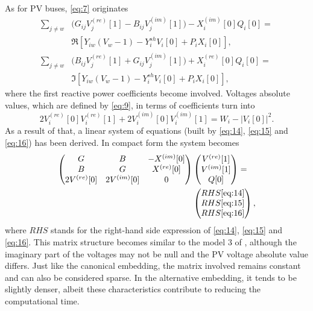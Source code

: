 \documentclass[conference]{IEEEtran}
\begin{document}
As for PV buses, \eqref{eq:7} originates
\begin{equation}
  \begin{split}
    \sum_{j\neq w}&\biggl(G_{ij}V^{(re)}_j[1]-B_{ij}V^{(im)}_j[1]\biggr)-X^{(im)}_i[0]Q_i[0]=\\
    &\Re[Y_{iw}(V_w-1) - Y^{sh}_iV_i[0]+P_iX_i[0]],\\
    \sum_{j\neq w}&\biggl(B_{ij}V^{(re)}_j[1]+G_{ij}V^{(im)}_j[1]\biggr)+X^{(re)}_i[0]Q_i[0]=\\
    &\Im[Y_{iw}(V_w-1) - Y^{sh}_iV_i[0]+P_iX_i[0]],
  \end{split}
  \label{eq:15}
\end{equation}
where the first reactive power coefficients become involved. Voltages absolute values, which are defined by \eqref{eq:9}, in terms of coefficients turn into
\begin{equation}
  2V^{(re)}_i[0]V^{(re)}_i[1]+2V^{(im)}_i[0]V^{(im)}_i[1]=W_i-|V_i[0]|^2.
  \label{eq:16}
\end{equation}
As a result of that, a linear system of equations (built by \eqref{eq:14}, \eqref{eq:15} and \eqref{eq:16}) has been derived. In compact form the system becomes
\begin{equation}
  \begin{split}
\begin{pmatrix}
    G & B & -X^{(im)}[0]\\
    B & G & X^{(re)}[0]\\
    2V^{(re)}[0] & 2V^{(im)}[0] & 0\\
  \end{pmatrix}&
  \begin{pmatrix}
    V^{(re)}[1]\\
    V^{(im)}[1]\\
    Q[0]
  \end{pmatrix}
  =\\
  &\begin{pmatrix}
    RHS\text{\eqref{eq:14}}\\
    RHS\text{\eqref{eq:15}}\\
    RHS\text{\eqref{eq:16}}
  \end{pmatrix},
\end{split}
  \label{eq:17}
\end{equation}
where $RHS$ stands for the right-hand side expression of \eqref{eq:14}, \eqref{eq:15} and \eqref{eq:16}. This matrix structure becomes similar to the model 3 of \cite{wallace}, although the imaginary part of the voltages may not be null and the PV voltage absolute value differs. Just like the canonical embedding, the matrix involved remains constant and can also be considered sparse. In the alternative embedding, it tends to be slightly denser, albeit these characteristics contribute to reducing the computational time.
\end{document}
